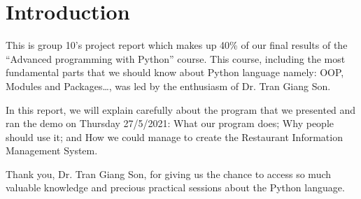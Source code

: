 \newpage
\vspace{6cm}
\section{Introduction}

\hspace{0.7cm}This is group 10’s project report which makes up 40\% of our final results of the “Advanced programming with Python” course. This course, including the most fundamental parts that we should know about Python language namely: OOP, Modules and Packages…, was led by the enthusiasm of Dr. Tran Giang Son.

\vspace{0.7cm}
In this report, we will explain carefully about the program that we presented and ran the demo on Thursday 27/5/2021: What our program does; Why people should use it; and How we could manage to create the Restaurant Information Management System.

\vspace{0.7cm}
Thank you, Dr. Tran Giang Son, for giving us the chance to access so much valuable knowledge and precious practical sessions about the Python language. 